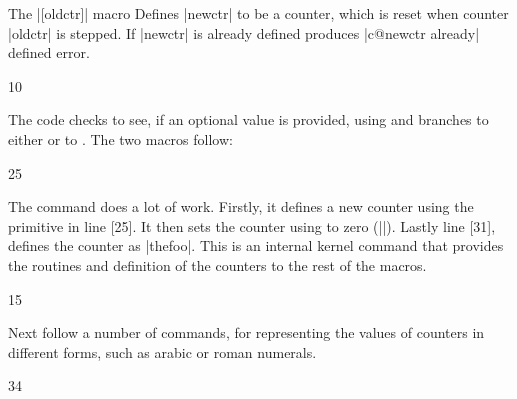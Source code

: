 
\begin{macro}{\newcounter}
The |[oldctr]| macro  Defines |newctr| to be a counter, which is
reset when counter |oldctr|  is stepped. If |newctr| is  already defined produces
|c@newctr already| defined  error.
\end{macro}

\begin{teXXX}
10 \def\newcounter#1{%
11   \expandafter\@ifdefinable \csname c@#1\endcsname
12   {\@definecounter{#1}}%
13   \@ifnextchar[{\@newctr{#1}}{}}
\end{teXXX}

The code checks to see, if an optional value is provided, using  and branches to either
 or to . The two macros follow:

\begin{teXXX}
25 \def\@definecounter#1{\expandafter\newcount\csname c@#1\endcsname
26   \setcounter{#1}\z@
27   \global\expandafter\let\csname cl@#1\endcsname\@empty
28   \@addtoreset{#1}{@ckpt}%
29   \global\expandafter\let\csname p@#1\endcsname\@empty
30   \expandafter
31   \gdef\csname the#1\expandafter\endcsname\expandafter
32       {\expandafter\@arabic\csname c@#1\endcsname}
}
\end{teXXX}

\begin{macro}{\@definecounter}
The command does a lot of work. Firstly, it defines a new counter using the \tex primitive  in line [25]. It then sets the counter using  to zero (|\z@|). Lastly line [31], defines the counter as |thefoo|. This is an internal kernel command that provides the routines and definition of the counters to the rest of the macros.
\end{macro}

\begin{teXXX}
15 \def\@newctr#1[#2]{%
16   \@ifundefined{c@#2}{\@nocounterr{#2}}{\@addtoreset{#1}{#2}}}
\end{teXXX}




\begin{macro}{\arabic} 
Next follow a number of commands, for representing the values of counters in different forms, such
as arabic or roman numerals.
\end{macro}

\begin{teXXX}
34 \def\arabic#1{\expandafter\@arabic\csname c@#1\endcsname}
\end{teXXX}

